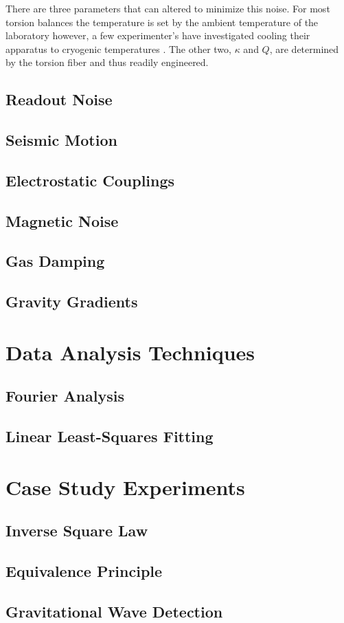 \documentclass{book}
\begin{document}
There are three parameters that can altered to minimize this noise. For most torsion balances the temperature is set by the ambient temperature of the laboratory however, a few experimenter's have investigated cooling their apparatus to cryogenic temperatures \cite{cryo}. The other two, $\kappa$ and $Q$, are determined by the torsion fiber and thus readily engineered. 

\section{Readout Noise}\label{readout}
\section{Seismic Motion}
\section{Electrostatic Couplings}\label{elect}
\section{Magnetic Noise}
\section{Gas Damping} \label{gas}
\section{Gravity Gradients}\label{gravGrad}

\chapter{Data Analysis Techniques}
\section{Fourier Analysis}
\section{Linear Least-Squares Fitting}

\chapter{Case Study Experiments}
\section{Inverse Square Law}
\section{Equivalence Principle}
\section{Gravitational Wave Detection}



\end{document}
